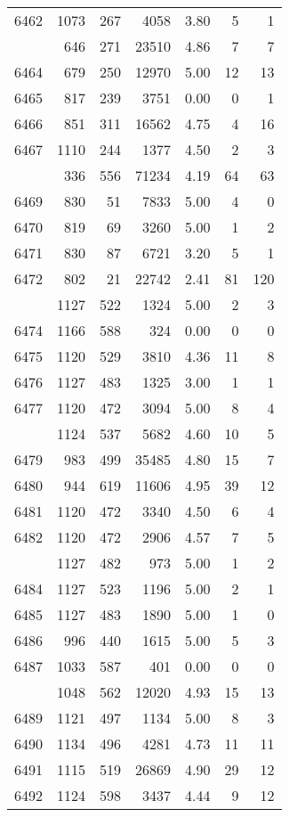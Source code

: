\documentclass[
]{article}
\begin{document}
\begin{table}
\begin{tabular}[t]{lrrrrrr}
6462 & 1073 & 267 & 4058 & 3.80 & 5 & 1\\
\addlinespace
6463 & 646 & 271 & 23510 & 4.86 & 7 & 7\\
6464 & 679 & 250 & 12970 & 5.00 & 12 & 13\\
6465 & 817 & 239 & 3751 & 0.00 & 0 & 1\\
6466 & 851 & 311 & 16562 & 4.75 & 4 & 16\\
6467 & 1110 & 244 & 1377 & 4.50 & 2 & 3\\
\addlinespace
6468 & 336 & 556 & 71234 & 4.19 & 64 & 63\\
6469 & 830 & 51 & 7833 & 5.00 & 4 & 0\\
6470 & 819 & 69 & 3260 & 5.00 & 1 & 2\\
6471 & 830 & 87 & 6721 & 3.20 & 5 & 1\\
6472 & 802 & 21 & 22742 & 2.41 & 81 & 120\\
\addlinespace
6473 & 1127 & 522 & 1324 & 5.00 & 2 & 3\\
6474 & 1166 & 588 & 324 & 0.00 & 0 & 0\\
6475 & 1120 & 529 & 3810 & 4.36 & 11 & 8\\
6476 & 1127 & 483 & 1325 & 3.00 & 1 & 1\\
6477 & 1120 & 472 & 3094 & 5.00 & 8 & 4\\
\addlinespace
6478 & 1124 & 537 & 5682 & 4.60 & 10 & 5\\
6479 & 983 & 499 & 35485 & 4.80 & 15 & 7\\
6480 & 944 & 619 & 11606 & 4.95 & 39 & 12\\
6481 & 1120 & 472 & 3340 & 4.50 & 6 & 4\\
6482 & 1120 & 472 & 2906 & 4.57 & 7 & 5\\
\addlinespace
6483 & 1127 & 482 & 973 & 5.00 & 1 & 2\\
6484 & 1127 & 523 & 1196 & 5.00 & 2 & 1\\
6485 & 1127 & 483 & 1890 & 5.00 & 1 & 0\\
6486 & 996 & 440 & 1615 & 5.00 & 5 & 3\\
6487 & 1033 & 587 & 401 & 0.00 & 0 & 0\\
\addlinespace
6488 & 1048 & 562 & 12020 & 4.93 & 15 & 13\\
6489 & 1121 & 497 & 1134 & 5.00 & 8 & 3\\
6490 & 1134 & 496 & 4281 & 4.73 & 11 & 11\\
6491 & 1115 & 519 & 26869 & 4.90 & 29 & 12\\
6492 & 1124 & 598 & 3437 & 4.44 & 9 & 12\\

\end{tabular}
\end{table}
\end{document}
